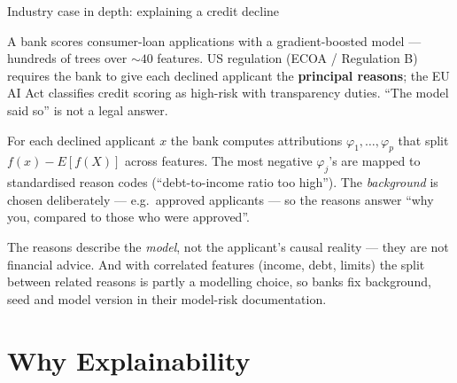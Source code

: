 \documentclass[aspectratio=169,11pt]{beamer}
\begin{document}
\begin{frame}{Industry case in depth: explaining a credit decline}
  \footnotesize
  \begin{industry}
    A bank scores consumer-loan applications with a gradient-boosted model --- hundreds
    of trees over $\sim 40$ features. US regulation (ECOA / Regulation B) requires the
    bank to give each declined applicant the \textbf{principal reasons}; the EU AI Act
    classifies credit scoring as high-risk with transparency duties. ``The model said
    so'' is not a legal answer.
  \end{industry}
  \begin{readme}
    For each declined applicant $x$ the bank computes attributions
    $\varphi_1,\dots,\varphi_p$ that split $f(x)-E[f(X)]$ across features. The most
    negative $\varphi_j$'s are mapped to standardised reason codes (``debt-to-income
    ratio too high''). The \emph{background} is chosen deliberately --- e.g.\ approved
    applicants --- so the reasons answer ``why you, compared to those who were
    approved''.
  \end{readme}
  \begin{takeaway}
    The reasons describe the \emph{model}, not the applicant's causal reality --- they
    are not financial advice. And with correlated features (income, debt, limits) the
    split between related reasons is partly a modelling choice, so banks fix background,
    seed and model version in their model-risk documentation.
  \end{takeaway}
\end{frame}

\section{Why Explainability}
\end{document}
